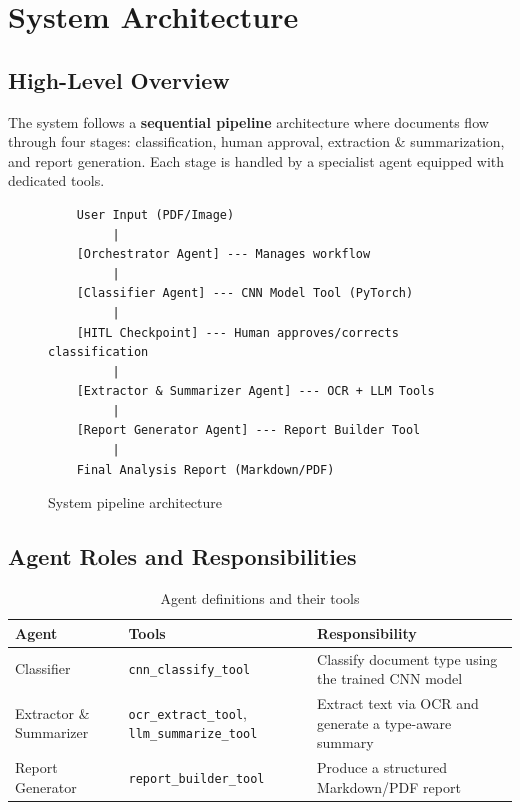 \documentclass[12pt,a4paper]{article}
\begin{document}
\section{System Architecture}

\subsection{High-Level Overview}
The system follows a \textbf{sequential pipeline} architecture where documents flow through four stages: classification, human approval, extraction \& summarization, and report generation. Each stage is handled by a specialist agent equipped with dedicated tools.

\begin{figure}[H]
\centering
\begin{verbatim}
    User Input (PDF/Image)
         |
    [Orchestrator Agent] --- Manages workflow
         |
    [Classifier Agent] --- CNN Model Tool (PyTorch)
         |
    [HITL Checkpoint] --- Human approves/corrects classification
         |
    [Extractor & Summarizer Agent] --- OCR + LLM Tools
         |
    [Report Generator Agent] --- Report Builder Tool
         |
    Final Analysis Report (Markdown/PDF)
\end{verbatim}
\caption{System pipeline architecture}
\end{figure}

\subsection{Agent Roles and Responsibilities}

\begin{table}[H]
\centering
\caption{Agent definitions and their tools}
\begin{tabular}{@{}llp{5.5cm}@{}}
\toprule
\textbf{Agent} & \textbf{Tools} & \textbf{Responsibility} \\
\midrule
Classifier & \texttt{cnn\_classify\_tool} & Classify document type using the trained CNN model \\
Extractor \& Summarizer & \texttt{ocr\_extract\_tool}, \texttt{llm\_summarize\_tool} & Extract text via OCR and generate a type-aware summary \\
Report Generator & \texttt{report\_builder\_tool} & Produce a structured Markdown/PDF report \\
\bottomrule
\end{tabular}
\end{table}
\end{document}
